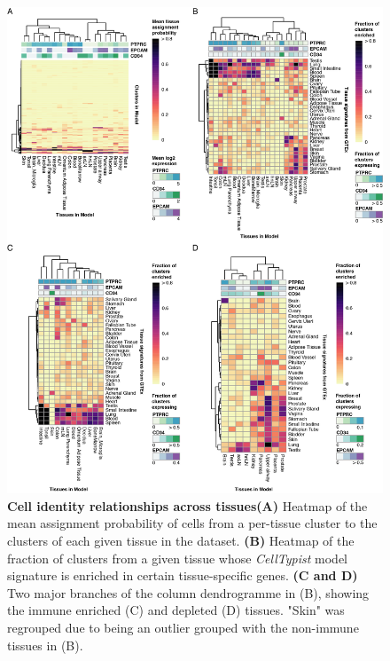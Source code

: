\begin{figure}[pht!]
    \centering    
    \includegraphics[scale=0.7185]{Chapter4/Figs/chap4_tissuefig.png} %
    \caption[Cell identity relationships across tissues]{\textbf{Cell identity relationships across tissues}\newline\textbf{(A)} Heatmap of the mean assignment probability of cells from a per-tissue cluster to the clusters of each given tissue in the dataset. \textbf{(B)} Heatmap of the fraction of clusters from a given tissue whose \textit{CellTypist} model signature is enriched in certain tissue-specific genes. \textbf{(C and D)} Two major branches of the column dendrogramme in (B), showing the immune enriched (C) and depleted (D) tissues. "Skin" was regrouped due to being an outlier grouped with the non-immune tissues in (B).}
    \label{fig:chap4_tiss}
\end{figure}

